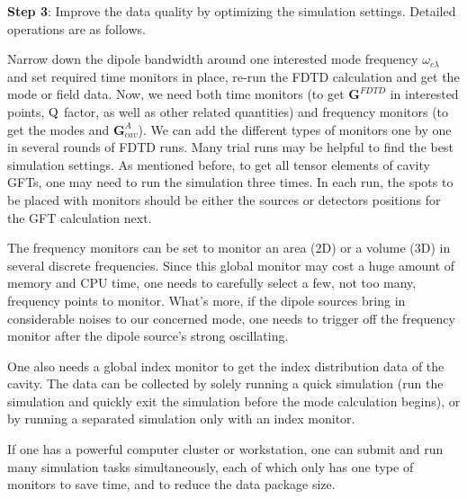\textbf{Step 3}: Improve the data quality by optimizing the simulation settings. Detailed operations are as follows.

Narrow down the dipole bandwidth around one interested mode frequency $\omega_{c\lambda}$ and set required time monitors in place,
re-run the FDTD calculation and get the mode or field data. Now, we need both time monitors (to get $\mathbf{G}^{FDTD}$ in interested points, ${\rm Q}$ factor,
as well as other related quantities) and frequency monitors (to get the modes and $\mathbf{G}^{A}_{cav}$).
We can add the different types of monitors one by one in several rounds of FDTD runs. Many trial runs may be helpful to find the best simulation settings. As mentioned before, to get all tensor elements of cavity GFTs, one may need to run the simulation three times. In each run, the spots to be placed with monitors should be either the sources or detectors positions for the GFT calculation next.



The frequency monitors can be set to monitor an area (2D) or a volume (3D) in several discrete frequencies.
Since this global monitor may cost a huge amount of memory and CPU time,
one needs to carefully select a few, not too many, frequency points to monitor.
What's more, if the dipole sources bring in considerable noises to our concerned mode,
one needs to trigger off the frequency monitor after the dipole source's strong oscillating.

One also needs a global index monitor to get the index distribution data of the cavity. The data can be collected by solely running a quick simulation
(run the simulation and quickly exit the simulation before the mode calculation begins), or by running a separated simulation only with an index monitor.

If one has a powerful computer cluster or workstation,
one can submit and run many simulation tasks simultaneously,
each of which only has one type of monitors to save time,
and to reduce the data package size.

